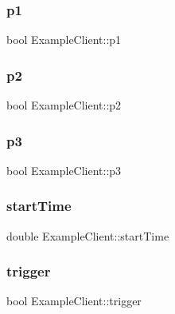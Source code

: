 \subsubsection{\texorpdfstring{p1}{p1}}
{\footnotesize\ttfamily bool Example\+Client\+::p1\hspace{0.3cm}{\ttfamily [private]}}

\hypertarget{classExampleClient_a07c2bc5c5c522e77a726017c28db2ec9}{}\label{classExampleClient_a07c2bc5c5c522e77a726017c28db2ec9} 
\subsubsection{\texorpdfstring{p2}{p2}}
{\footnotesize\ttfamily bool Example\+Client\+::p2\hspace{0.3cm}{\ttfamily [private]}}

\hypertarget{classExampleClient_ab41df6f34a51e649051adbac6d3077f9}{}\label{classExampleClient_ab41df6f34a51e649051adbac6d3077f9} 
\subsubsection{\texorpdfstring{p3}{p3}}
{\footnotesize\ttfamily bool Example\+Client\+::p3\hspace{0.3cm}{\ttfamily [private]}}

\hypertarget{classExampleClient_aaa5ec782e9aaa1e94d7182872f743c02}{}\label{classExampleClient_aaa5ec782e9aaa1e94d7182872f743c02} 
\subsubsection{\texorpdfstring{start\+Time}{startTime}}
{\footnotesize\ttfamily double Example\+Client\+::start\+Time\hspace{0.3cm}{\ttfamily [private]}}

\hypertarget{classExampleClient_a90ce0c4d970c903b3e6afb6f5ca2a228}{}\label{classExampleClient_a90ce0c4d970c903b3e6afb6f5ca2a228} 
\subsubsection{\texorpdfstring{trigger}{trigger}}
{\footnotesize\ttfamily bool Example\+Client\+::trigger\hspace{0.3cm}{\ttfamily [private]}}


